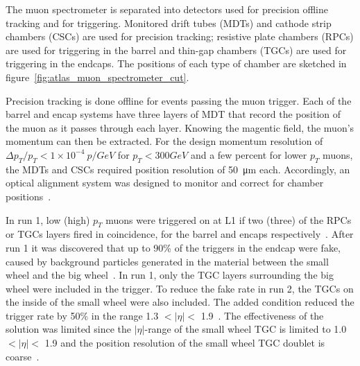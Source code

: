 The muon spectrometer is separated into detectors used for precision offline tracking and for triggering. Monitored drift tubes (MDTs) and cathode strip chambers (CSCs) are used for precision tracking; resistive plate chambers (RPCs) are used for triggering in the barrel and thin-gap chambers (TGCs) are used for triggering in the endcaps. The positions of each type of chamber are sketched in figure~\ref{fig:atlas_muon_spectrometer_cut}. 

Precision tracking is done offline for events passing the muon trigger. Each of the barrel and encap systems have three layers of MDT that record the position of the muon as it passes through each layer. Knowing the magentic field, the muon's momentum can then be extracted. For the design momentum resolution of $\Delta p_T / p_T < 1\times10^{-4}~p / GeV$ for $p_T < 300 GeV$ and a few percent for lower $p_T$ muons, the MDTs and CSCs required position resolution of \SI{50}{\micro\meter} each. Accordingly, an optical alignment system was designed to monitor and correct for chamber positions~\cite{atlas_muon_spectrometer_tdr, aefsky_optical_2008}. 

In run 1, low (high) $p_T$ muons were triggered on at L1 if two (three) of the RPCs or TGCs layers fired in coincidence, for the barrel and encaps respectively~\cite{atlas_l1_trigger_tdr}. After run 1 it was discovered that up to 90\% of the triggers in the endcap were fake, caused by background particles generated in the material between the small wheel and the big wheel~\cite{nsw_tdr}. In run 1, only the TGC layers surrounding the big wheel were included in the trigger. To reduce the fake rate in run 2, the TGCs on the inside of the small wheel were also included. The added condition reduced the trigger rate by 50\% in the range 1.3 $< |\eta| <$ 1.9~\cite{martinez_run-2_2016}. The effectiveness of the solution was limited since the $|\eta|$-range of the small wheel TGC is limited to 1.0 $< |\eta| <$ 1.9 and the position resolution of the small wheel TGC doublet is coarse~\cite{nsw_tdr}.


